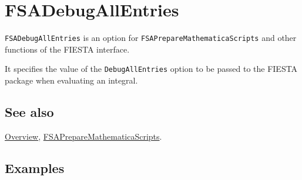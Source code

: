 \documentclass[../FeynHelpersManual.tex]{subfiles}
\begin{document}
\begin{Shaded}
\begin{Highlighting}[]
 
\end{Highlighting}
\end{Shaded}

\hypertarget{fsadebugallentries}{
\section{FSADebugAllEntries}\label{fsadebugallentries}}

\texttt{FSADebugAllEntries} is an option for
\texttt{FSAPrepareMathematicaScripts} and other functions of the FIESTA
interface.

It specifies the value of the \texttt{DebugAllEntries} option to be
passed to the FIESTA package when evaluating an integral.

\subsection{See also}

\hyperlink{toc}{Overview},
\hyperlink{fsapreparemathematicascripts}{FSAPrepareMathematicaScripts}.

\subsection{Examples}
\end{document}

